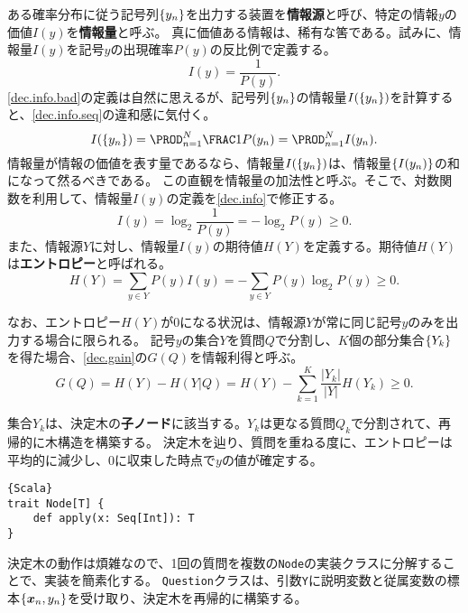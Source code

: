 \documentclass[10pt,a4paper]{book}
\begin{document}
ある確率分布に従う記号列$\seq{y_n}$を出力する装置を\textbf{情報源}と呼び、特定の情報$y$の価値$I(y)$を\textbf{情報量}と呼ぶ。
真に価値ある情報は、稀有な筈である。試みに、情報量$I(y)$を記号$y$の出現確率$P(y)$の反比例で定義する。
%
\begin{equation}
\label{eq:dec.info.bad}
I(y) = \frac{1}{P(y)}.
\end{equation}
%
\eqref{dec.info.bad}の定義は自然に思えるが、記号列$\seq{y_n}$の情報量$I(\seq{y_n})$を計算すると、\eqref{dec.info.seq}の違和感に気付く。
%
\begin{equation}
\label{eq:dec.info.seq}
I(\seq{y_n}) = \prod_{n=1}^N \frac{1}{P(y_n)} = \prod_{n=1}^N I(y_n).
\end{equation}
%
情報量が情報の価値を表す量であるなら、情報量$I(\seq{y_n})$は、情報量$\seq{I(y_n)}$の和になって然るべきである。
この直観を情報量の加法性と呼ぶ。そこで、対数関数を利用して、情報量$I(y)$の定義を\eqref{dec.info}で修正する。
%
\begin{equation}
\label{eq:dec.info}
I(y) = \log_2 \frac{1}{P(y)} = - \log_2 P(y) \geq 0.
\end{equation}
%
また、情報源$Y$に対し、情報量$I(y)$の期待値$H(Y)$を定義する。期待値$H(Y)$は\textbf{エントロピー}と呼ばれる。
%
\begin{equation}
\label{eq:dec.ent}
H(Y) = \sum_{y \in Y} P(y) I(y) = - \sum_{y \in Y} P(y) \log_2 P(y) \geq 0. 
\end{equation}

なお、エントロピー$H(Y)$が$0$になる状況は、情報源$Y$が常に同じ記号$y$のみを出力する場合に限られる。
記号$y$の集合$Y$を質問$Q$で分割し、$K$個の部分集合$\seq{Y_k}$を得た場合、\eqref{dec.gain}の$G(Q)$を情報利得と呼ぶ。
%
\begin{equation}
\label{eq:dec.gain}
G(Q) = H(Y) - H(Y|Q) = H(Y) - \sum_{k=1}^K \frac{|Y_k|}{|Y|} H(Y_k) \geq 0.
\end{equation}

集合$Y_k$は、決定木の\textbf{子ノード}に該当する。$Y_k$は更なる質問$Q_k$で分割されて、再帰的に木構造を構築する。
決定木を辿り、質問を重ねる度に、エントロピーは平均的に減少し、$0$に収束した時点で$y$の値が確定する。

\begin{Verbatim}{Scala}
trait Node[T] {
	def apply(x: Seq[Int]): T
}
\end{Verbatim}

決定木の動作は煩雑なので、1回の質問を複数の\texttt{Node}の実装クラスに分解することで、実装を簡素化する。
\texttt{Question}クラスは、引数\texttt{Y}に説明変数と従属変数の標本$\seq{\bm{x}_n,y_n}$を受け取り、決定木を再帰的に構築する。
\end{document}

